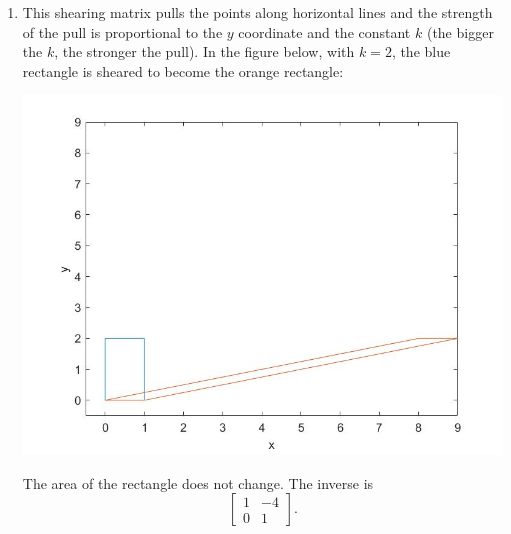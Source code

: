 \begin{sol}
\begin{enumerate}
        \item This shearing matrix pulls the points along horizontal lines and the strength of the pull is proportional to the $y$ coordinate and the constant $k$ (the bigger the $k$, the stronger the pull). In the figure below, with $k=2$, the blue rectangle is sheared to become the orange rectangle: 
        \begin{center}
        \includegraphics[width=.75\textwidth]{FacesDay2/figs/bigxshear.jpg}
        \label{fig:bigxshear}
    \end{center}
    The area of the rectangle does not change. The inverse is
    $$\begin{bmatrix}
    1 & -4 \\ 0 & 1
    \end{bmatrix}.$$
    

\end{enumerate}
\end{sol}
